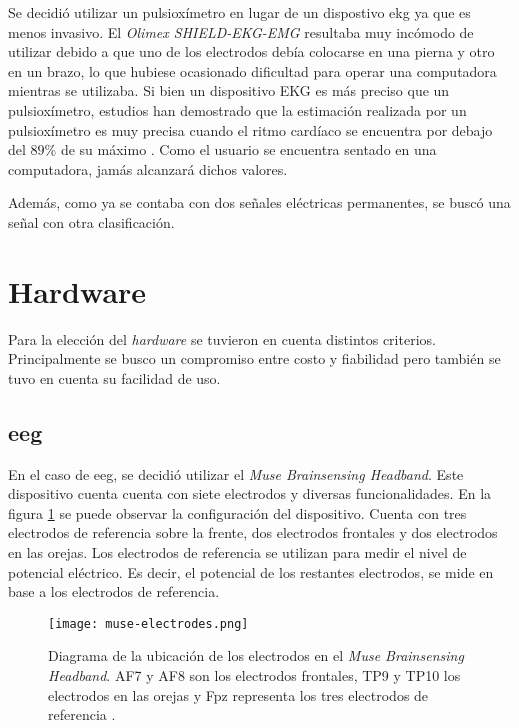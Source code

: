 Se decidió utilizar un pulsioxímetro en lugar de un dispostivo {ekg} ya que es menos invasivo. El \emph{Olimex SHIELD-EKG-EMG} resultaba muy incómodo de utilizar debido a que uno de los electrodos debía colocarse en una pierna y otro en un brazo, lo que hubiese ocasionado dificultad para operar una computadora mientras se utilizaba. Si bien un dispositivo EKG es más preciso que un pulsioxímetro, estudios han demostrado que la estimación realizada por un pulsioxímetro es muy precisa cuando el ritmo cardíaco se encuentra por debajo del $89\% $ de su máximo \cite{spo2-accuracy}. Como el usuario se encuentra sentado en una computadora, jamás alcanzará dichos valores.

Además, como ya se contaba con dos señales eléctricas permanentes, se buscó una señal con otra clasificación.

\section{Hardware}

 Para la elección del \emph{hardware} se tuvieron en cuenta distintos criterios. Principalmente se busco un compromiso entre costo y fiabilidad pero también se tuvo en cuenta su facilidad de uso.

\subsection{\acrshort{eeg}}

En el caso de \acrshort{eeg}, se decidió utilizar el \emph{Muse Brainsensing Headband}. Este dispositivo cuenta cuenta con siete electrodos y diversas funcionalidades. En la figura \ref{fig:muse-electrodes} se puede observar la configuración del dispositivo. Cuenta con tres electrodos de referencia sobre la frente, dos electrodos frontales y dos electrodos en las orejas. Los electrodos de referencia se utilizan para medir el nivel de potencial eléctrico. Es decir, el potencial de los restantes electrodos, se mide en base a los electrodos de referencia.

\begin{figure}[H]
	\centering
    \texttt{[image: muse-electrodes.png]}
    \caption{Diagrama de la ubicación de los electrodos en el \emph{Muse Brainsensing Headband}. AF7 y AF8 son los electrodos frontales, TP9 y TP10 los electrodos en las orejas y Fpz representa los tres electrodos de referencia \cite{muse-hardware}.}
	\label{fig:muse-electrodes}
\end{figure}

